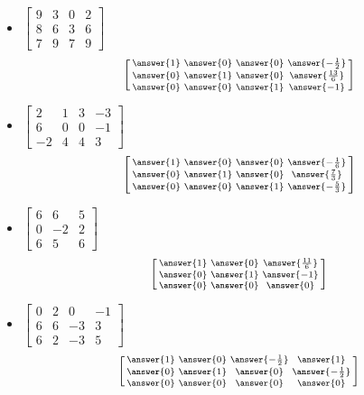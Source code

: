 \documentclass{ximera}
\begin{document}
\begin{exercise}
\begin{itemize}
\[        \]
        \item
        $\begin{bmatrix}
            9 & 3 & 0 & 2 \\
            8 & 6 & 3 & 6 \\
            7 & 9 & 7 & 9
        \end{bmatrix}$
        \[
            \left[\begin{smallmatrix} \answer{1} & \answer{0} & \answer{0} & \answer{-\frac{1}{2}} \\ \answer{0} & \answer{1} & \answer{0} & \answer{\frac{13}{6}} \\ \answer{0} & \answer{0} & \answer{1} & \answer{-1}  \end{smallmatrix}\right]
        \]
        \item
        $\begin{bmatrix}
            2 & 1 & 3 & -3 \\
            6 & 0 & 0 & -1 \\
            -2 & 4 & 4 & 3
        \end{bmatrix}$
        \[
            \left[\begin{smallmatrix} \answer{1} & \answer{0} & \answer{0} & \answer{-\frac{1}{6}} \\ \answer{0} & \answer{1} & \answer{0} & \answer{\frac{7}{3}} \\ \answer{0} & \answer{0} & \answer{1} & \answer{-\frac{5}{3}} \end{smallmatrix}\right]
        \]
        \item
        $\begin{bmatrix}
            6 & 6 & 5 \\
            0 & -2 & 2 \\
            6 & 5 & 6
        \end{bmatrix}$
        \[
            \left[\begin{smallmatrix} \answer{1} & \answer{0} & \answer{\frac{11}{6}} \\ \answer{0} & \answer{1} & \answer{-1} \\ \answer{0} & \answer{0} & \answer{0} \end{smallmatrix}\right]
        \]
        \item
        $\begin{bmatrix}
            0 & 2 & 0 & -1 \\
            6 & 6 & -3 & 3 \\
            6 & 2 & -3 & 5
        \end{bmatrix}$
        \[
            \left[\begin{smallmatrix} \answer{1} & \answer{0} & \answer{-\frac{1}{2}} & \answer{1} \\ \answer{0} & \answer{1} & \answer{0} & \answer{-\frac{1}{2}} \\ \answer{0} & \answer{0} & \answer{0} & \answer{0} \end{smallmatrix}\right]
        \]
    \end{itemize}
\end{exercise}
\end{document}
